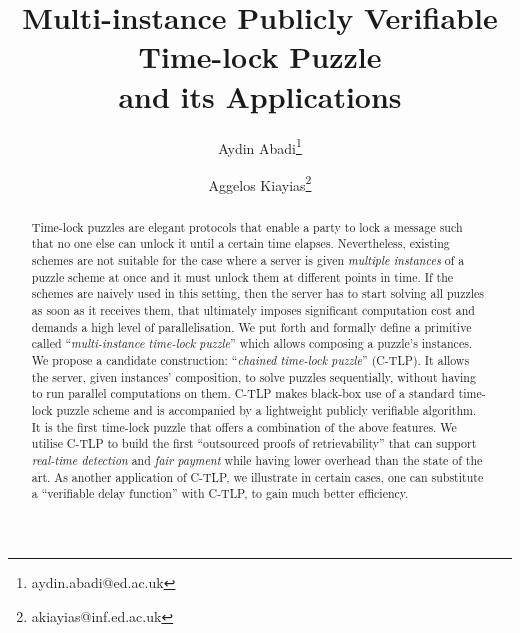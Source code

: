 \documentclass[orivec]{llncs}
\begin{document}
  \setlength\abovedisplayskip{0pt}
  \setlength\belowdisplayskip{0pt}


\newenvironment{packed_item}{
\begin{itemize}
	\setlength{\topsep}{0pt}
	\setlength{\partopsep}{0pt}
  \setlength{\itemsep}{0pt}
  \setlength{\parskip}{0pt}
  \setlength{\parsep}{0pt}
}{\end{itemize}}

\newenvironment{packed_enum}{
\begin{enumerate}
	\setlength{\topsep}{0pt}
	\setlength{\partopsep}{0pt}
  \setlength{\itemsep}{0pt}
  \setlength{\parskip}{0pt}
  \setlength{\parsep}{0pt}
}{\end{enumerate}}






\title{Multi-instance Publicly Verifiable Time-lock Puzzle\\ and its Applications}




\author{%
Aydin Abadi\thanks{aydin.abadi@ed.ac.uk}  \and 
Aggelos Kiayias\thanks{akiayias@inf.ed.ac.uk}
}%

\date{}
\maketitle




\begin{abstract}
Time-lock puzzles  are elegant  protocols that enable a party  to lock a message such that  no one else  can unlock it until a certain time  elapses. Nevertheless, existing  schemes are not suitable for the case where  a server is given \emph{multiple instances} of a puzzle scheme at once and  it  must unlock them at different points in time. If the schemes are naively used  in  this setting, then the server has to start solving all puzzles as soon as it receives them, that  ultimately imposes significant computation cost and demands a high  level of parallelisation. We put forth and formally define a primitive called ``\emph{multi-instance time-lock puzzle}'' which allows composing a puzzle's instances. We  propose a candidate construction: ``\emph{chained  time-lock puzzle}'' (C-TLP). It allows  the server, given instances' composition,  to solve  puzzles sequentially, without having to run parallel computations on them.  C-TLP makes black-box use of a standard time-lock puzzle scheme  and is  accompanied by a lightweight publicly verifiable algorithm. It is the first time-lock puzzle  that offers a combination of   the above features.  We utilise C-TLP  to build the first ``outsourced  proofs of retrievability''  that can support  \emph{real-time detection} and \emph{fair payment}  while having lower overhead than the state of the art.  
As another application of C-TLP,  we illustrate in certain cases, one can substitute a ``verifiable delay function''  with C-TLP, to gain much better efficiency. 
\end{abstract}
\end{document}
